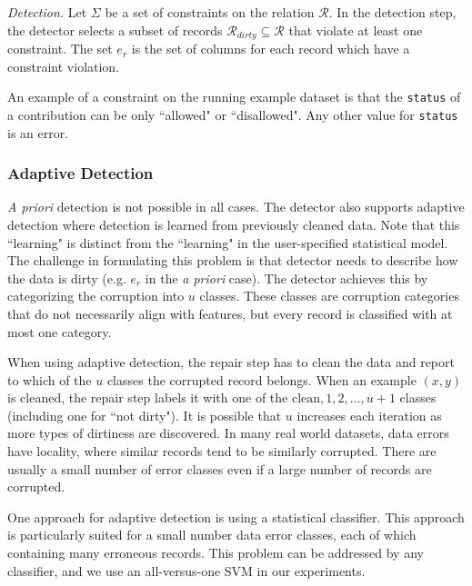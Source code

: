 \vspace{0.5em}

\emph{Detection. } Let $\Sigma$ be a set of constraints on the relation $\mathcal{R}$. 
In the detection step, the detector selects a subset of records $\mathcal{R}_{dirty} \subseteq \mathcal{R}$ that violate at least one constraint.
The set $e_r$ is the set of columns for each record which have a constraint violation. 

\begin{example}\label{detex1}
An example of a constraint on the running example dataset is that the \texttt{status} of
a contribution can be only ``allowed" or ``disallowed".
Any other value for \texttt{status} is an error.
\end{example}

\subsubsection{Adaptive Detection}
\emph{A priori} detection is not possible in all cases.
The detector also supports adaptive detection where detection is learned from previously cleaned data.
Note that this ``learning" is distinct from the ``learning" in the user-specified statistical model.
The challenge in formulating this problem is that detector needs to describe how the data is dirty (e.g. $e_r$ in the \emph{a priori} case).
The detector achieves this by categorizing the corruption into $u$ classes.
These classes are corruption categories that do not necessarily align with features, but every record is classified with at most one category.

When using adaptive detection, the repair step has to clean the data and report to which of the $u$ classes the corrupted record belongs.
When an example $(x,y)$ is cleaned, the repair step labels it with one of the ${\text{clean}, 1,2,...,u+1}$ classes (including one for ``not dirty").
It is possible that $u$ increases each iteration as more types of dirtiness are discovered.
In many real world datasets, data errors have locality, where similar records tend to be similarly corrupted.
There are usually a small number of error classes even if a large number of records are corrupted.

One approach for adaptive detection is using a statistical classifier. 
This approach is particularly suited for a small number data error classes, each of which containing many erroneous records.
This problem can be addressed by any classifier, and we use an all-versus-one SVM in our experiments.

